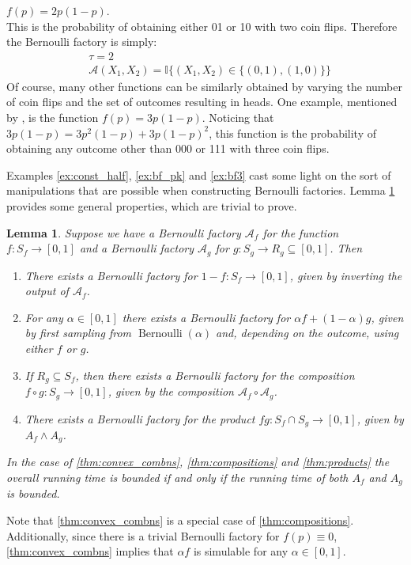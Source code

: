 \documentclass{article}
\newtheorem{lemma}{Lemma}
\theoremstyle{definition}
\newenvironment{example}
  {\pushQED{\qed}\renewcommand{\qedsymbol}{$\triangle$}\examplex}
  {\popQED\endexamplex}
\newcommand{\Bern}{\operatorname{Bernoulli}}
\newcommand{\A}{\mathcal{A}}
\begin{document}
\begin{example}\label{ex:bf3}
$f(p) = 2p(1-p)$.\\
This is the probability of obtaining either 01 or 10 with two coin flips. Therefore the Bernoulli factory is simply:
\begin{align*}
& \tau = 2 \\
& \A(X_1,X_2) = \mathbb{I}\{(X_1,X_2) \in \{(0,1),(1,0)\} \}
\end{align*}
Of course, many other functions can be similarly obtained by varying the number of coin flips and the set of outcomes resulting in heads. One example, mentioned by \citet{patel2018}, is the function $f(p) = 3p(1-p)$. Noticing that $3p(1-p) = 3p^2(1-p) + 3p(1-p)^2$, this function is the probability of obtaining any outcome other than 000 or 111 with three coin flips.
\end{example}

Examples \ref{ex:const_half}, \ref{ex:bf_pk} and \ref{ex:bf3} cast some light on the sort of manipulations that are possible when constructing Bernoulli factories. Lemma \ref{thm:products_compositions} provides some general properties, which are trivial to prove.

\begin{lemma}\label{thm:products_compositions}
Suppose we have a Bernoulli factory $\A_f$ for the function $f:S_f\to[0,1]$ and a Bernoulli factory $\A_g$ for $g:S_g\to R_g\subseteq[0,1]$. Then
\begin{enumerate}[label=(\alph*)]
\item There exists a Bernoulli factory for $1-f: S_f \to [0,1]$, given by inverting the output of $\A_f$.
\item \label{thm:convex_combns} For any $\alpha \in [0,1]$ there exists a Bernoulli factory for $\alpha f + (1-\alpha) g$, given by first sampling from $\Bern(\alpha)$ and, depending on the outcome, using either $f$ or $g$.
\item \label{thm:compositions} If $R_g \subseteq S_f$, then there exists a Bernoulli factory for the composition $f\circ g: S_g \to [0,1]$, given by the composition $\A_f \circ \A_g$.
\item \label{thm:products} There exists a Bernoulli factory for the product $fg:S_f \cap S_g \to [0,1]$, given by $A_f \wedge A_g$.
\end{enumerate}
In the case of \ref{thm:convex_combns}, \ref{thm:compositions} and \ref{thm:products} the overall running time is bounded if and only if the running time of both $A_f$ and $A_g$ is bounded.
\end{lemma}
Note that \ref{thm:convex_combns} is a special case of \ref{thm:compositions}.
Additionally, since there is a trivial Bernoulli factory for $f(p)\equiv 0$, \ref{thm:convex_combns} implies that $\alpha f$ is simulable for any $\alpha\in[0,1]$.\\
\end{document}
